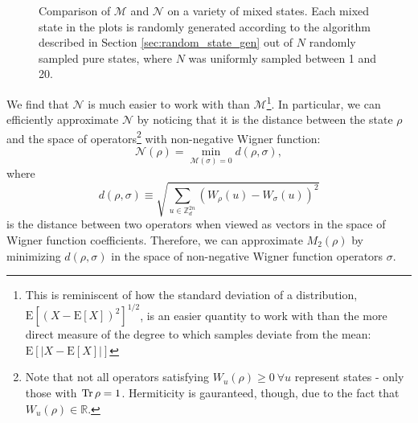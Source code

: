 \documentclass{article}
\begin{document}
\begin{figure}[H]
\centering
{}\hspace{1.5em} 
\caption{Comparison of $\mathcal M$ and $\mathcal N$ on a variety of mixed states. Each mixed state in the plots is randomly generated according to the algorithm described in Section \ref{sec:random_state_gen} out of $N$ randomly sampled pure states, where $N$ was uniformly sampled between 1 and 20.}
\end{figure}

We find that $\mathcal N$ is much easier to work with than $\mathcal M$\footnote{This is reminiscent of how the standard deviation of a distribution, $\mathrm{E}[(X-\mathrm{E}[X])^2]^{1/2}$, is an easier quantity to work with than the more direct measure of the degree to which samples deviate from the mean: $\mathrm{E}[|X-\mathrm{E}[X]|]$}. In particular, we can efficiently approximate $\mathcal N$ by noticing that it is the distance between the state $\rho$ and the space of operators\footnote{Note that not all operators satisfying $W_u(\rho)\geq 0\ \forall u$ represent states - only those with $\operatorname{Tr}\rho=1$. Hermiticity is gauranteed, though, due to the fact that $W_u(\rho)\in \mathbb R$.} with non-negative Wigner function:
\begin{equation}\mathcal N(\rho)=\underset{\mathcal M(\sigma)=0}{\min}d(\rho,\sigma),\end{equation}
where
\begin{equation}d(\rho,\sigma)\equiv \sqrt{\sum_{u\in \mathbb Z_d^{2n}} \left(W_{\rho}(u)-W_{\sigma}(u)\right)^2}\end{equation}
is the distance between two operators when viewed as vectors in the space of Wigner function coefficients. Therefore, we can approximate $M_2(\rho)$ by minimizing $d(\rho,\sigma)$ in the space of non-negative Wigner function operators $\sigma$. 
\end{document}
